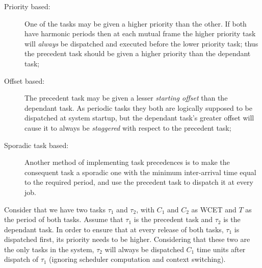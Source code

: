\begin{description}
\item[Priority based:]{One of the tasks may be given a higher priority
  than the other. If both have harmonic periods then at each mutual
  frame the higher priority task will \emph{always} be dispatched and
  executed before the lower priority task; thus the precedent task
  should be given a higher priority than the dependant task;}
\item[Offset based:]{The precedent task may be given a lesser
  \emph{starting offset} than the dependant task. As periodic tasks
  they both are logically supposed to be dispatched at system startup,
  but the dependant task's greater offset will cause it to always be
  \emph{staggered} with respect to the precedent task;}
\item[Sporadic task based:]{Another method of implementing task
  precedences is to make the consequent task a sporadic one with the
  minimum inter-arrival time equal to the required period, and use the
  precedent task to dispatch it at every job.}
\end{description}

Consider that we have two tasks $\tau_1$ and $\tau_2$, with $C_1$ and
$C_2$ as WCET and $T$ as the period of both tasks. Assume that
$\tau_1$ is the precedent task and $\tau_2$ is the dependant task. In
order to ensure that at every release of both tasks, $\tau_1$ is
dispatched first, its priority needs to be higher. Considering that
these two are the only tasks in the system, $\tau_2$ will always be
dispatched $C_1$ time units after dispatch of $\tau_1$ (ignoring
scheduler computation and context switching).


